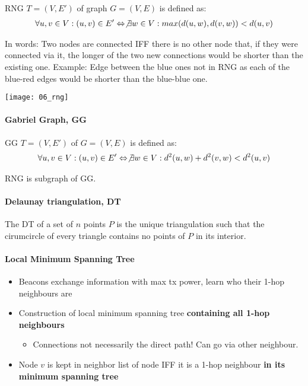 RNG $T = (V, E')$ of graph $G = (V, E)$ is defined as:
\begin{align*}
		\forall u, v \in V: (u, v) \in E' \Leftrightarrow \not\exists w \in V: max(d(u, w), d(v, w)) < d(u, v)
\end{align*}

In words: Two nodes are connected IFF there is no other node that, if they were
connected via it, the longer of the two new connections would be shorter than
the existing one. Example: Edge between the blue ones not in RNG as each of the
blue-red edges would be shorter than the blue-blue one.

\texttt{[image: 06\_rng]}

\paragraph{Gabriel Graph, GG}

GG $T = (V, E')$ of $G = (V, E)$ is defined as:
\begin{align*}
		\forall u, v \in V: (u, v) \in E' \Leftrightarrow \not \exists w \in V : d^2(u, w) + d^2(v, w) < d^2(u, v)
\end{align*}

RNG is subgraph of GG.

\paragraph{Delaunay triangulation, DT}

The DT of a set of $n$ points $P$ is the unique triangulation such that the
cirumcircle of every triangle contains no points of $P$ in its interior.

\paragraph{Local Minimum Spanning Tree}

\begin{itemize}
		\item Beacons exchange information with max tx power, learn who their 1-hop neighbours are
		\item Construction of local minimum spanning tree \textbf{containing all 1-hop neighbours}
				\begin{itemize}
						\item Connections not necessarily the direct path! Can go via other neighbour.
				\end{itemize}
		\item Node $v$ is kept in neighbor list of node IFF it is a 1-hop
				neighbour \textbf{in its minimum spanning tree}
\end{itemize}

